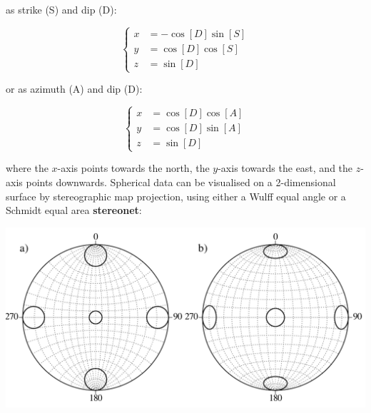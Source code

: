 \noindent as strike (S) and dip (D):

\begin{equation}
  \left\{
  \begin{split}
    x & = -\cos[D]\sin[S]\\
    y & = \cos[D]\cos[S]\\
    z & = \sin[D]
  \end{split}
  \right.
  \label{eq:SD}
\end{equation}

\noindent or as azimuth (A) and dip (D):

\begin{equation}
  \left\{
  \begin{split}
    x & = \cos[D] \cos[A]\\
    y & = \cos[D] \sin[A]\\
    z & = \sin[D]
  \end{split}
  \right.
  \label{eq:AD}
\end{equation}

\noindent where the $x$-axis points towards the north, the $y$-axis
towards the east, and the $z$-axis points downwards.  Spherical data
can be visualised on a 2-dimensional surface by stereographic map
projection, using either a Wulff equal angle or a Schmidt equal area
\textbf{stereonet}:

\noindent\begin{minipage}[t][][b]{.6\textwidth}
\includegraphics[width=\textwidth]{../figures/wulffschmidt.pdf}\\
\end{minipage}
\begin{minipage}[t][][t]{.4\textwidth}
  \label{fig:wulffschmidt}
\end{minipage}


